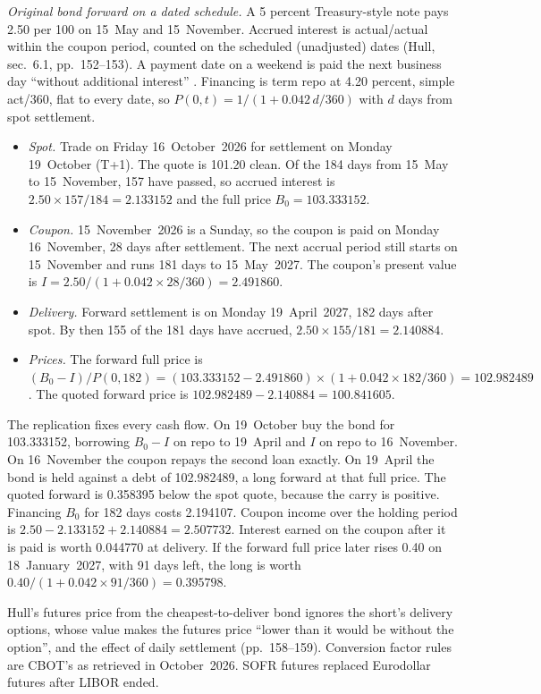 \begin{qfmethod}
\emph{Original bond forward on a dated schedule.} A 5 percent Treasury-style note pays 2.50 per 100 on 15~May and 15~November. Accrued interest is actual/actual within the coupon period, counted on the scheduled (unadjusted) dates (Hull, sec.~6.1, pp.~152--153). A payment date on a weekend is paid the next business day ``without additional interest'' \citep[sec.~356.30(a)]{cfr-31-356-30-payment-dates}. Financing is term repo at 4.20 percent, simple act/360, flat to every date, so $P(0,t)=1/(1+0.042\,d/360)$ with $d$ days from spot settlement.
\begin{itemize}
\item \emph{Spot.} Trade on Friday 16~October~2026 for settlement on Monday 19~October (T+1). The quote is 101.20 clean. Of the 184 days from 15~May to 15~November, 157 have passed, so accrued interest is $2.50\times157/184=2.133152$ and the full price $B_0=103.333152$.
\item \emph{Coupon.} 15~November~2026 is a Sunday, so the coupon is paid on Monday 16~November, 28 days after settlement. The next accrual period still starts on 15~November and runs 181 days to 15~May~2027. The coupon's present value is $I=2.50/(1+0.042\times28/360)=2.491860$.
\item \emph{Delivery.} Forward settlement is on Monday 19~April~2027, 182 days after spot. By then 155 of the 181 days have accrued, $2.50\times155/181=2.140884$.
\item \emph{Prices.} The forward full price is $(B_0-I)/P(0,182)=(103.333152-2.491860)\times(1+0.042\times182/360)=102.982489$. The quoted forward price is $102.982489-2.140884=100.841605$.
\end{itemize}
The replication fixes every cash flow. On 19~October buy the bond for 103.333152, borrowing $B_0-I$ on repo to 19~April and $I$ on repo to 16~November. On 16~November the coupon repays the second loan exactly. On 19~April the bond is held against a debt of 102.982489, a long forward at that full price. The quoted forward is 0.358395 below the spot quote, because the carry is positive. Financing $B_0$ for 182 days costs 2.194107. Coupon income over the holding period is $2.50-2.133152+2.140884=2.507732$. Interest earned on the coupon after it is paid is worth 0.044770 at delivery. If the forward full price later rises 0.40 on 18~January~2027, with 91 days left, the long is worth $0.40/(1+0.042\times91/360)=0.395798$.

 Hull's futures price from the cheapest-to-deliver bond ignores the short's delivery options, whose value makes the futures price ``lower than it would be without the option'', and the effect of daily settlement (pp.~158--159). Conversion factor rules are CBOT's as retrieved in October~2026. SOFR futures replaced Eurodollar futures after LIBOR ended.


\end{qfmethod}
